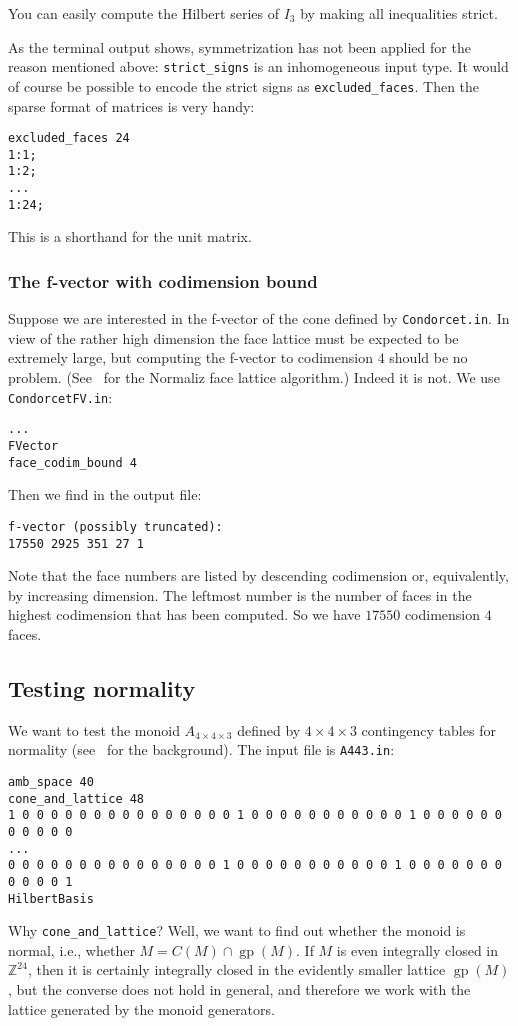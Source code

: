 \documentclass[12pt,a4paper]{scrartcl}
\theoremstyle{definition}
\def\ZZ{{\mathbb Z}}
\DeclareMathOperator{\gp}{gp}
\def\ttt{\texttt}
\begin{document}
You can easily compute the Hilbert series of $I_3$ by making all inequalities strict.

As the terminal output shows, symmetrization has not been applied for the reason mentioned above: \verb|strict_signs| is an inhomogeneous input type. It would of course be possible to encode the strict signs as \verb|excluded_faces|. Then the sparse format of matrices is very handy:
\begin{Verbatim}
excluded_faces 24
1:1;
1:2;
...
1:24;
\end{Verbatim}
This is a shorthand for the unit matrix.

\subsubsection{The f-vector with codimension bound}\label{codim_bound}

Suppose we are interested in the f-vector of the cone defined by \ttt{Condorcet.in}. In view of the rather high dimension the face lattice must be expected to be extremely large, but computing the f-vector to codimension $4$ should be no problem. (See~\cite{BGOW} for the Normaliz face lattice algorithm.) Indeed it is not. We use \ttt{CondorcetFV.in}:
\begin{Verbatim}
...
FVector
face_codim_bound 4
\end{Verbatim}

Then we find in the output file:
\begin{Verbatim}
f-vector (possibly truncated):
17550 2925 351 27 1
\end{Verbatim}
Note that the face numbers are listed by descending codimension or, equivalently, by increasing dimension. The leftmost number is the number of faces in the highest codimension that has been computed. So we have $17550$ codimension $4$ faces.


\subsection{Testing normality}\label{normalization_ex}

We want to test the monoid $A_{4\times 4\times 3}$ defined by $4\times4\times3$ contingency tables for normality (see~\cite{BHIKS} for the background). The input file is \ttt{A443.in}:
\begin{Verbatim}
amb_space 40
cone_and_lattice 48
1 0 0 0 0 0 0 0 0 0 0 0 0 0 0 0 1 0 0 0 0 0 0 0 0 0 0 0 1 0 0 0 0 0 0 0 0 0 0 0
...
0 0 0 0 0 0 0 0 0 0 0 0 0 0 0 1 0 0 0 0 0 0 0 0 0 0 0 1 0 0 0 0 0 0 0 0 0 0 0 1
HilbertBasis
\end{Verbatim}
Why \verb|cone_and_lattice|? Well, we want to find out whether the monoid is normal, i.e., whether $M=C(M)\cap\gp(M)$. If $M$ is even integrally closed in $\ZZ^{24}$, then it is certainly integrally closed in the evidently smaller lattice $\gp(M)$, but the converse does not hold in general, and therefore we work with the lattice generated by the monoid generators.
\end{document}
